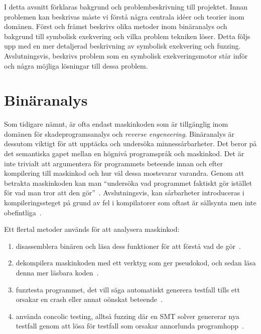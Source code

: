 I detta avsnitt förklaras bakgrund och problembeskrivning till projektet. Innan
problemen kan beskrivas måste vi förstå några centrala idéer och teorier inom
domänen. Först och främst beskrivs olika metoder inom binäranalys och bakgrund
till symbolisk exekvering och vilka problem tekniken löser. Detta följs upp med
en mer detaljerad beskrivning av symbolisk exekvering och fuzzing.
Avslutningsvis, beskrivs problem som en symbolisk exekveringsmotor står inför
och några möjliga lösningar till dessa problem.

\section{Binäranalys}
\label{sec:binar_analys}
Som tidigare nämnt, är ofta endast maskinkoden som är tillgänglig inom domänen
för skadeprogramsanalys och \emph{reverse engeneering}. Binäranalys är dessutom
viktigt för att upptäcka och undersöka minnessårbarheter. Det beror på det
semantiska gapet mellan en högnivå programspråk och maskinkod. Det är inte
trivialt att argumentera för programmets beteende innan och efter kompilering
till maskinkod och hur väl dessa mostsvarar varandra. Genom att betrakta
maskinkoden kan man ``undersöka vad programmet faktiskt gör istället för vad
man tror att den gör''~\cite{andriesse2018}. Avslutningsvis, kan sårbarheter
introduceras i kompileringssteget på grund av fel i kompilatorer som oftast är
sällsynta men inte obefintliga~\cite{silentbugsmatter}.

Ett flertal metoder används för att analysera maskinkod:
\begin{enumerate}
    \item disassemblera binären och läsa dess funktioner för att förstå vad de gör~\cite{ghidra_website}.
    \item dekompilera maskinkoden med ett verktyg som ger pseudokod, och sedan läsa denna mer
          läsbara koden~\cite{ghidra_website}.
    \item fuzztesta programmet, det vill säga automatiskt generera testfall tills ett orsakar en crash eller
          annat oönskat beteende~\cite{8371326}.
    \item använda concolic testing, alltså fuzzing där en SMT solver genererar nya testfall genom att
          lösa för testfall som orsakar annorlunda programhopp~\cite{sage}.
\end{enumerate}


